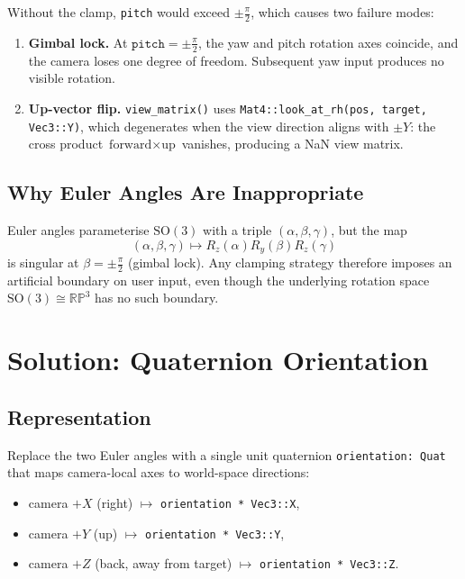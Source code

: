 \documentclass[11pt]{article}
\begin{document}
Without the clamp, \texttt{pitch} would exceed $\pm\tfrac{\pi}{2}$,
which causes two failure modes:
\begin{enumerate}
  \item \textbf{Gimbal lock.}  At $\texttt{pitch} = \pm\tfrac{\pi}{2}$,
        the yaw and pitch rotation axes coincide, and the camera loses
        one degree of freedom.  Subsequent yaw input produces no
        visible rotation.
  \item \textbf{Up-vector flip.}  \texttt{view\_matrix()} uses
        \texttt{Mat4::look\_at\_rh(pos, target, Vec3::Y)}, which
        degenerates when the view direction aligns with $\pm Y$:
        the cross product $\text{forward} \times \text{up}$ vanishes,
        producing a NaN view matrix.
\end{enumerate}

\subsection{Why Euler Angles Are Inappropriate}

Euler angles parameterise $\mathrm{SO}(3)$ with a triple
$(\alpha, \beta, \gamma)$, but the map
\[
  (\alpha, \beta, \gamma) \mapsto R_z(\alpha) R_y(\beta) R_z(\gamma)
\]
is singular at $\beta = \pm \tfrac{\pi}{2}$ (gimbal lock).  Any
clamping strategy therefore imposes an artificial boundary on user
input, even though the underlying rotation space
$\mathrm{SO}(3) \cong \mathbb{RP}^3$ has no such boundary.

\section{Solution: Quaternion Orientation}

\subsection{Representation}

Replace the two Euler angles with a single unit quaternion
\texttt{orientation: Quat} that maps camera-local axes to world-space
directions:
\begin{itemize}
  \item camera $+X$ (right) $\mapsto$ \texttt{orientation * Vec3::X},
  \item camera $+Y$ (up)    $\mapsto$ \texttt{orientation * Vec3::Y},
  \item camera $+Z$ (back, away from target) $\mapsto$
        \texttt{orientation * Vec3::Z}.
\end{itemize}
\end{document}
